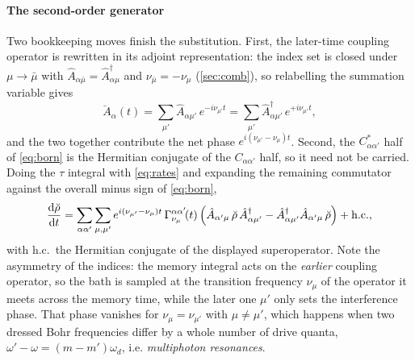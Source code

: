 \documentclass[a4paper,11pt]{article}
\begin{document}
\paragraph{The second-order generator}
Two bookkeeping moves finish the substitution. First, the later-time coupling operator is rewritten in its adjoint representation: the index set is closed under $\mu\to\bar\mu$ with $\hat A_{\alpha\bar\mu} = \hat A_{\alpha\mu}^\dagger$ and $\nu_{\bar\mu} = -\nu_\mu$ (\cref{sec:comb}), so relabelling the summation variable gives
\begin{equation}\label{eq:adjointrep}
  \breve A_\alpha(t) = \sum_{\mu'}\hat A_{\alpha\mu'}\,e^{-i\nu_{\mu'}t}
  = \sum_{\mu'}\hat A_{\alpha\mu'}^\dagger\,e^{+i\nu_{\mu'}t},
\end{equation}
and the two together contribute the net phase $e^{i(\nu_{\mu'}-\nu_\mu)t}$. Second, the $C^*_{\alpha\alpha'}$ half of \cref{eq:born} is the Hermitian conjugate of the $C_{\alpha\alpha'}$ half, so it need not be carried. Doing the $\tau$ integral with \cref{eq:rates} and expanding the remaining commutator against the overall minus sign of \cref{eq:born},
\begin{equation}\label{eq:preclosure}
  \dv{\breve\rho}{t}
  = \sum_{\alpha\alpha'}\sum_{\mu,\mu'} e^{i(\nu_{\mu'}-\nu_{\mu})t}\,\Gamma^{\alpha\alpha'}_{\nu_\mu}\!(t)\,
  \Big( \hat A_{\alpha'\mu}\,\breve\rho\,\hat A_{\alpha\mu'}^\dagger
  - \hat A_{\alpha\mu'}^\dagger \hat A_{\alpha'\mu}\,\breve\rho \Big) + \mathrm{h.c.},
\end{equation}
with h.c.\ the Hermitian conjugate of the displayed superoperator. Note the asymmetry of the indices: the memory integral acts on the \emph{earlier} coupling operator, so the bath is sampled at the transition frequency $\nu_\mu$ of the operator it meets across the memory time, while the later one $\mu'$ only sets the interference phase. That phase vanishes for $\nu_\mu = \nu_{\mu'}$ with $\mu\neq\mu'$, which happens when two dressed Bohr frequencies differ by a whole number of drive quanta, $\omega'-\omega = (m-m')\omega_d$, i.e. \emph{multiphoton resonances}. 
\end{document}
